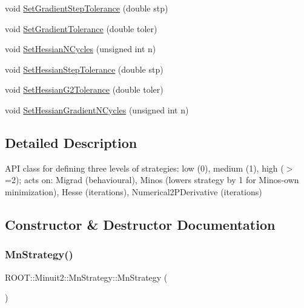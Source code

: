 \begin{DoxyCompactItemize}
\item 
void \mbox{\hyperlink{classROOT_1_1Minuit2_1_1MnStrategy_ad6051100db67df070103c2478740ee8f}{Set\+Gradient\+Step\+Tolerance}} (double stp)
\item 
void \mbox{\hyperlink{classROOT_1_1Minuit2_1_1MnStrategy_aa7e6c4626962cd81e05821955ff562aa}{Set\+Gradient\+Tolerance}} (double toler)
\item 
void \mbox{\hyperlink{classROOT_1_1Minuit2_1_1MnStrategy_a7d97d197e18c686e2cdb826ea514de28}{Set\+Hessian\+N\+Cycles}} (unsigned int n)
\item 
void \mbox{\hyperlink{classROOT_1_1Minuit2_1_1MnStrategy_a8711f7c9983983c83fd5d192bc9304f7}{Set\+Hessian\+Step\+Tolerance}} (double stp)
\item 
void \mbox{\hyperlink{classROOT_1_1Minuit2_1_1MnStrategy_aed3f2b229af4c5a4091507830f4275e0}{Set\+Hessian\+G2\+Tolerance}} (double toler)
\item 
void \mbox{\hyperlink{classROOT_1_1Minuit2_1_1MnStrategy_ad8984d94901eaf8cad19fe49647449bf}{Set\+Hessian\+Gradient\+N\+Cycles}} (unsigned int n)
\end{DoxyCompactItemize}


\subsection{Detailed Description}
A\+PI class for defining three levels of strategies\+: low (0), medium (1), high ($>$=2); acts on\+: Migrad (behavioural), Minos (lowers strategy by 1 for Minos-\/own minimization), Hesse (iterations), Numerical2\+P\+Derivative (iterations) 

\subsection{Constructor \& Destructor Documentation}
\mbox{\label{classROOT_1_1Minuit2_1_1MnStrategy_a231337ee8aec47874370bc4b64683374}} 
\subsubsection{\texorpdfstring{MnStrategy()}{MnStrategy()}\hspace{0.1cm}{\footnotesize\ttfamily [1/4]}}
{\footnotesize\ttfamily R\+O\+O\+T\+::\+Minuit2\+::\+Mn\+Strategy\+::\+Mn\+Strategy (\begin{DoxyParamCaption}{ }\end{DoxyParamCaption})}

